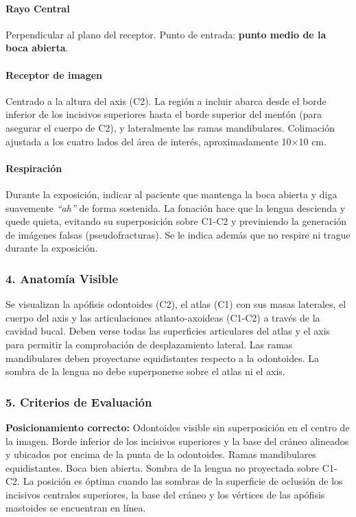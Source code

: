 	\paragraph{Rayo Central}
	Perpendicular al plano del receptor. Punto de entrada: \textbf{punto medio de la boca abierta}.
	
	\paragraph{Receptor de imagen}
	Centrado a la altura del axis (C2). La región a incluir abarca desde el borde inferior de los incisivos superiores hasta el borde superior del mentón (para asegurar el cuerpo de C2), y lateralmente las ramas mandibulares. Colimación ajustada a los cuatro lados del área de interés, aproximadamente 10$\times$10 cm.
	
	\paragraph{Respiración}
	Durante la exposición, indicar al paciente que mantenga la boca abierta y diga suavemente \textit{``ah''} de forma sostenida. La fonación hace que la lengua descienda y quede quieta, evitando su superposición sobre C1-C2 y previniendo la generación de imágenes falsas (pseudofracturas). Se le indica además que no respire ni trague durante la exposición.
	
	\subsubsection*{4. Anatomía Visible}
	
	Se visualizan la apófisis odontoides (C2), el atlas (C1) con sus masas laterales, el cuerpo del axis y las articulaciones atlanto-axoideas (C1-C2) a través de la cavidad bucal. Deben verse todas las superficies articulares del atlas y el axis para permitir la comprobación de desplazamiento lateral. Las ramas mandibulares deben proyectarse equidistantes respecto a la odontoides. La sombra de la lengua no debe superponerse sobre el atlas ni el axis.
	
	\subsubsection*{5. Criterios de Evaluación}
	
	\textbf{Posicionamiento correcto:} Odontoides visible sin superposición en el centro de la imagen. Borde inferior de los incisivos superiores y la base del cráneo alineados y ubicados por encima de la punta de la odontoides. Ramas mandibulares equidistantes. Boca bien abierta. Sombra de la lengua no proyectada sobre C1-C2. La posición es óptima cuando las sombras de la superficie de oclusión de los incisivos centrales superiores, la base del cráneo y los vértices de las apófisis mastoides se encuentran en línea.
	
